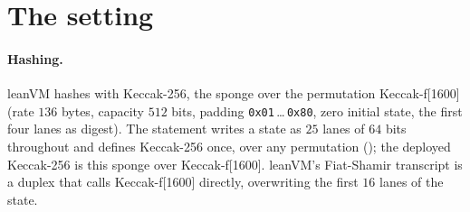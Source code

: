 \documentclass[11pt]{article}
\begin{document}
\section{The setting}

\paragraph{Hashing.} leanVM hashes with Keccak-256, the sponge over the permutation
Keccak-f[1600] (rate $136$ bytes, capacity $512$ bits, padding \texttt{0x01}\,\dots\,\texttt{0x80},
zero initial state, the first four lanes as digest). The statement writes a state as $25$ lanes of
$64$ bits throughout and defines Keccak-256 once, over any permutation ();
the deployed Keccak-256 is this sponge over Keccak-f[1600]. leanVM's Fiat-Shamir transcript is a
duplex that calls Keccak-f[1600] directly, overwriting the first $16$ lanes of the state.
\end{document}
